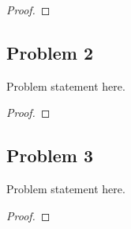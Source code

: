 \documentclass[11pt]{scrartcl}
\begin{document}
\begin{proof}
\end{proof}

\begin{remark*}
\end{remark*}

\pagebreak








\subsection{Problem 2}

\begin{tcolorbox}[purplebox,title={Problem statement}]
Problem statement here.
\end{tcolorbox}

\begin{claim*}
\end{claim*}

\begin{proof}
\end{proof}

\begin{remark*}
\end{remark*}

\pagebreak








\subsection{Problem 3}

\begin{tcolorbox}[purplebox,title={Problem statement}]
Problem statement here.
\end{tcolorbox}

\begin{claim*}
\end{claim*}

\begin{proof}
\end{proof}

\begin{remark*}
\end{remark*}
\end{document}
